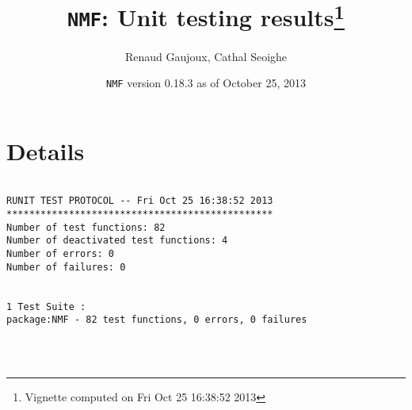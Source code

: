 \documentclass[10pt]{article}\usepackage[]{graphicx}\usepackage[]{color}
\author{Renaud Gaujoux, Cathal Seoighe}
\title{\texttt{NMF}: Unit testing results\footnote{Vignette computed  on Fri Oct 25 16:38:52 2013}}
\date{\texttt{NMF} version 0.18.3 as of October 25, 2013}
\begin{document}
\maketitle

\section{Details}
\begin{verbatim}

RUNIT TEST PROTOCOL -- Fri Oct 25 16:38:52 2013 
*********************************************** 
Number of test functions: 82 
Number of deactivated test functions: 4 
Number of errors: 0 
Number of failures: 0 

 
1 Test Suite : 
package:NMF - 82 test functions, 0 errors, 0 failures




\end{verbatim}
\end{document}
